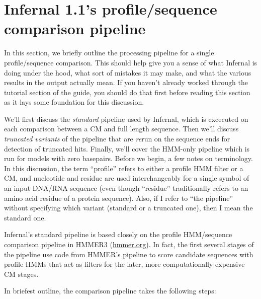 \section{Infernal 1.1's profile/sequence comparison pipeline}
\label{section:pipeline}
\setcounter{footnote}{0}

In this section, we briefly outline the processing pipeline for a
single profile/sequence comparison. This should help give you a sense
of what Infernal is doing under the hood, what sort of mistakes it may
make, and what the various results in the output actually mean. If you
haven't already worked through the tutorial section of the guide, you
should do that first before reading this section as it lays some
foundation for this discussion.

We'll first discuss the \emph{standard} pipeline used by Infernal,
which is excecuted on each comparison between a CM and full length
sequence. Then we'll discuss \emph{truncated variants} of the pipeline
that are \emph{re}run on the sequence ends for detection of truncated
hits. Finally, we'll cover the HMM-only pipeline which is run for
models with zero basepairs. Before we begin, a few notes on
terminology. In this discussion, the term ``profile'' refers to either
a profile HMM filter or a CM, and nucleotide and residue are used
interchangeably for a single symbol of an input DNA/RNA sequence (even
though ``residue'' traditionally refers to an amino acid residue of a
protein sequence). Also, if I refer to ``the pipeline'' without
specifying which variant (standard or a truncated one), then I mean
the standard one.

Infernal's standard pipeline is based closely on the profile
HMM/sequence comparison pipeline in HMMER3 (\url{hmmer.org}). In fact,
the first several stages of the pipeline use code from HMMER's
pipeline to score candidate sequences with profile HMMs that act as
filters for the later, more computationally expensive CM stages.

In briefest outline, the comparison pipeline takes the following
steps:

